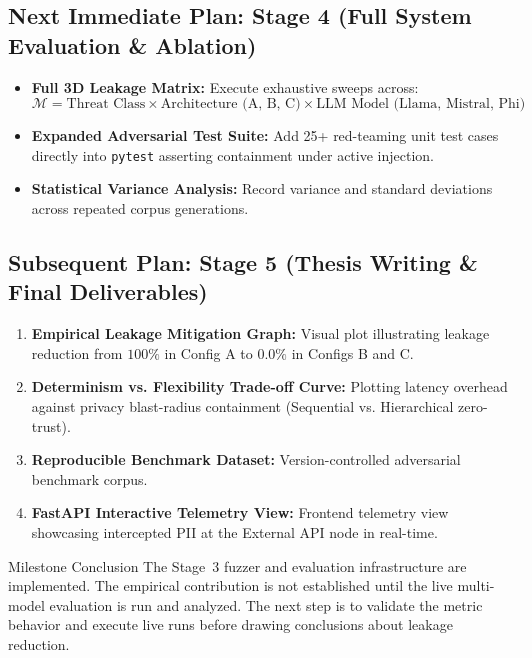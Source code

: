 \documentclass[10pt,a4paper]{article}
\begin{document}
\subsection{Next Immediate Plan: Stage 4 (Full System Evaluation \& Ablation)}
\begin{itemize}
    \item \textbf{Full 3D Leakage Matrix:} Execute exhaustive sweeps across:
    \[
    \mathcal{M} = \text{Threat Class} \times \text{Architecture (A, B, C)} \times \text{LLM Model (Llama, Mistral, Phi)}
    \]
    \item \textbf{Expanded Adversarial Test Suite:} Add 25+ red-teaming unit test cases directly into \texttt{pytest} asserting containment under active injection.
    \item \textbf{Statistical Variance Analysis:} Record variance and standard deviations across repeated corpus generations.
\end{itemize}

\subsection{Subsequent Plan: Stage 5 (Thesis Writing \& Final Deliverables)}
\begin{enumerate}
    \item \textbf{Empirical Leakage Mitigation Graph:} Visual plot illustrating leakage reduction from $100\%$ in Config A to $0.0\%$ in Configs B and C.
    \item \textbf{Determinism vs. Flexibility Trade-off Curve:} Plotting latency overhead against privacy blast-radius containment (Sequential vs. Hierarchical zero-trust).
    \item \textbf{Reproducible Benchmark Dataset:} Version-controlled adversarial benchmark corpus.
    \item \textbf{FastAPI Interactive Telemetry View:} Frontend telemetry view showcasing intercepted PII at the External API node in real-time.
\end{enumerate}

\begin{successbox}{Milestone Conclusion}
The Stage~3 fuzzer and evaluation infrastructure are implemented. The empirical contribution is not established until the live multi-model evaluation is run and analyzed. The next step is to validate the metric behavior and execute live runs before drawing conclusions about leakage reduction.
\end{successbox}
\end{document}
